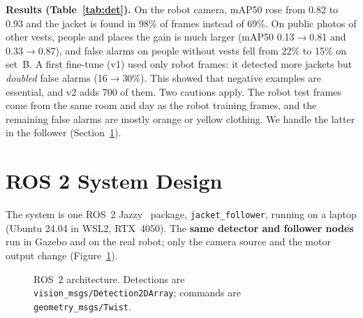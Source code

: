 \documentclass[10pt]{article}
\begin{document}
\textbf{Results (Table~\ref{tab:det}).} On the robot camera, mAP50 rose from 0.82 to 0.93 and the jacket is found in 98\% of frames instead of 69\%. On public photos of other vests, people and places the gain is much larger (mAP50 0.13$\rightarrow$0.81 and 0.33$\rightarrow$0.87), and false alarms on people without vests fell from 22\% to 15\% on set~B. A first fine-tune (v1) used only robot frames: it detected more jackets but \emph{doubled} false alarms (16$\rightarrow$30\%). This showed that negative examples are essential, and v2 adds 700 of them. Two cautions apply. The robot test frames come from the same room and day as the robot training frames, and the remaining false alarms are mostly orange or yellow clothing. We handle the latter in the follower (Section~\ref{sec:ros}).

\section{ROS 2 System Design}\label{sec:ros}
The system is one ROS~2 Jazzy~\cite{ros2} package, \texttt{jacket\_follower}, running on a laptop (Ubuntu 24.04 in WSL2, RTX~4050). The \textbf{same detector and follower nodes} run in Gazebo and on the real robot; only the camera source and the motor output change (Figure~\ref{fig:arch}).

\begin{figure}[htbp]
\centering
{}
\caption{ROS~2 architecture. Detections are \texttt{vision\_msgs/Detection2DArray}; commands are \texttt{geometry\_msgs/Twist}.}
\label{fig:arch}
\end{figure}
\end{document}

